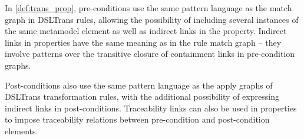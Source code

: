 




In \cref{def:trans_prop}, pre-conditions use the same pattern language as the match graph in
DSLTrans rules, allowing the possibility of including several instances of
the same metamodel element as well as indirect links in the property. Indirect links in properties have
the same meaning as in the rule match graph -- they
involve patterns over the transitive closure of containment links in pre-condition graphs.

Post-conditions also use the same pattern language as the
apply graphs of DSLTrans transformation rules, with the additional
possibility of expressing indirect links in post-conditions. Traceability links can
also be used in properties to impose traceability relations between pre-condition
and post-condition elements.

